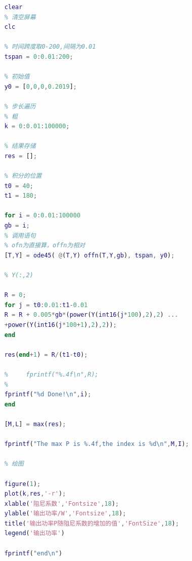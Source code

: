 \documentclass[12pt,utf8]{article}
\begin{document}
\begin{lstlisting}[language=matlab,caption={求解问题2-1的MatLab代码（粗算）}]
	% 清空所有变量
	clear
	% 清空屏幕
	clc
	
	% 时间跨度取0-200,间隔为0.01
	tspan = 0:0.01:200;
	
	% 初始值
	y0 = [0,0,0,0.2019];
	
	% 步长遍历
	% 粗
	k = 0:0.01:100000;
	
	% 结果存储
	res = [];
	
	% 积分的位置
	t0 = 40;
	t1 = 180;
	
	for i = 0:0.01:100000
	gb = i;
	% 调用语句
	% ofn为直接算，offn为相对
	[T,Y] = ode45( @(T,Y) offn(T,Y,gb), tspan, y0);
	
	% Y(:,2)
	
	R = 0;
	for j = t0:0.01:t1-0.01
	R = R + 0.005*gb*(power(Y(int16(j*100),2),2) ...
	+power(Y(int16(j*100+1),2),2));
	end
	
	res(end+1) = R/(t1-t0);
	
	%     fprintf("%.4f\n",R);
	% 
	fprintf("%d Done!\n",i);
	end
	
	[M,L] = max(res);
	
	fprintf("The max P is %.4f,the index is %d\n",M,I);
	
	% 绘图
	
	figure(1);
	plot(k,res,'-r');
	xlable('阻尼系数','Fontsize',18);
	ylable('输出功率/W','Fontsize',18);
	title('输出功率P随阻尼系数的增加的值','FontSize',18);
	legend('输出功率')
	
	fprintf("end\n")
\end{lstlisting}
\end{document}
